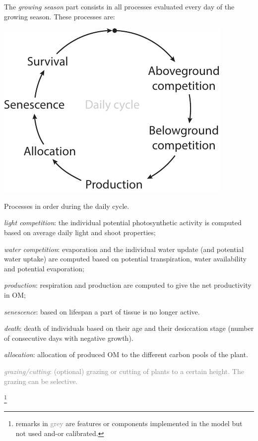 The \textit{growing season} part consists in all processes evaluated every day of the growing season. These processes are:
\begin{marginfigure}
\includegraphics{./Figures/daily_cycle_t.pdf}
\caption{Processes in order during the daily cycle.}
\end{marginfigure}
\begin{itemize}
\setlength\itemsep{0em}
\item \textit{light competition}: the individual potential photosynthetic activity is computed based on average daily light and shoot properties;
\item \textit{water competition}: evaporation and the individual water update (and potential water uptake) are computed based on potential transpiration, water availability and potential evaporation;
\item \textit{production}: respiration and production are computed to give the net productivity in OM;
\item \textit{senescence}: based on lifespan a part of tissue is no longer active.
\item \textit{death}: death of individuals based on their age and their desiccation stage (number of consecutive days with negative growth).
\item \textit{allocation}: allocation of produced OM to the different carbon pools of the plant.
\textcolor{Gray}{\item \textit{grazing/cutting}: (optional) grazing or cutting of plants to a certain height. The grazing can be selective.}\footnote{remarks in \textcolor{Gray}{grey} are features or components implemented in the model but not used and-or calibrated.}
\end{itemize}


